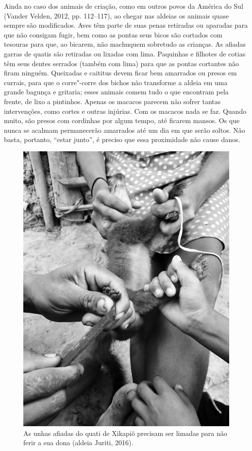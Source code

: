 Ainda no caso dos animais de criação, como em outros povos da América do
Sul (Vander Velden, 2012, pp. 112--117), ao chegar nas aldeias os animais
quase sempre são modificados. Aves têm parte de suas penas retiradas ou
aparadas para que não consigam fugir, bem como as pontas seus bicos são
cortados com tesouras para que, ao bicarem, não machuquem sobretudo as
crianças. As afiadas garras de quatis são retiradas ou lixadas com lima.
Paquinhas e filhotes de cotias têm seus dentes serrados (também com
lima) para que as pontas cortantes não firam ninguém. Queixadas e
caititus devem ficar bem amarrados ou presos em currais, para que o
corre"-corre dos bichos não transforme a aldeia em uma grande bagunça e
gritaria; esses animais comem tudo o que encontram pela frente, de lixo
a pintinhos. Apenas os macacos parecem não sofrer tantas intervenções,
como cortes e outras injúrias. Com os macacos nada se faz. Quando muito,
são presos com cordinhas por algum tempo, até ficarem mansos. Os que
nunca se acalmam permanecerão amarrados até um dia em que serão soltos.
Não basta, portanto, ``estar junto'', é preciso que essa proximidade não
cause danos.

\begin{figure}[!ht]
\centering
  \includegraphics[width=\textwidth]{./imgs/IMG_0343}
\caption{As unhas afiadas do quati de Xikapiõ precisam ser limadas para não ferir a
sua dona (aldeia Juriti, 2016).}
\end{figure}

